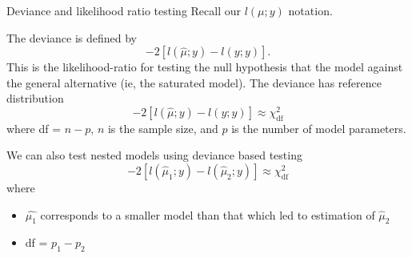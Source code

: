 \documentclass[
  ignorenonframetext,
]{beamer}
\providecommand{\tightlist}{%
  \setlength{\itemsep}{0pt}\setlength{\parskip}{0pt}}
\begin{document}
\begin{frame}{Deviance and likelihood ratio testing}
\protect\hypertarget{deviance-and-likelihood-ratio-testing}{}
Recall our \(l(\mu;y)\) notation.

\vspace{12pt}

The deviance is defined by \[
 -2\left[l(\hat\mu;y) - l(y;y)\right].
\] This is the likelihood-ratio for testing the null hypothesis that the
model against the general alternative (ie, the saturated model). The
deviance has reference distribution \[
  -2\left[l(\hat\mu;y) - l(y;y)\right] \approx \chi^2_{\text{df}}
\] where df = \(n - p\), \(n\) is the sample size, and \(p\) is the
number of model parameters.
\end{frame}

\begin{frame}{}
\protect\hypertarget{section-12}{}
We can also test nested models using deviance based testing \[
  -2\left[l(\hat\mu_1;y) - l(\hat\mu_2;y)\right] \approx \chi^2_{\text{df}}
\] where

\begin{itemize}
\tightlist
\item
  \(\hat{\mu_1}\) corresponds to a smaller model than that which led to
  estimation of \(\hat{\mu}_2\)
\item
  df = \(p_1 - p_2\)
\end{itemize}
\end{frame}
\end{document}
